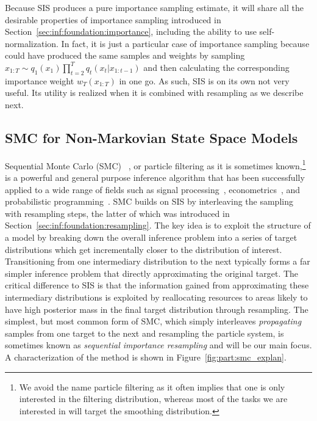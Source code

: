 Because SIS produces a pure importance sampling estimate, it will share all the desirable properties
of importance sampling introduced in Section~\ref{sec:inf:foundation:importance}, including the
ability to use self-normalization.  In fact, it is just
a particular case of importance sampling because could have produced the same samples and weights
by sampling $x_{1:T} \sim q_1(x_1) \prod_{t=2}^{T} q_t (x_t | x_{1:t-1})$ and then calculating the
corresponding importance weight $w_T(x_{1:T})$ in one go. As such, 
SIS is on its own not very useful.  Its utility is realized when it is combined with resampling as we describe next.

\subsection{SMC for Non-Markovian State Space Models}
\label{sec:part:smc:smc-nmssm}

Sequential Monte Carlo (SMC)~\citep{gordon1993novel,doucet2001sequential,doucet2009tutorial} , or particle filtering 
as it is sometimes known,\footnote{We avoid the name
	particle filtering as it often implies that one is only interested in the filtering distribution, whereas
	most of the tasks we are interested in will target the smoothing distribution.} 
is a powerful and general purpose inference algorithm that has been successfully
applied to a wide range of fields such as signal processing~\citep{candy2016bayesian}, econometrics~\citep{creal2012survey}, 
and probabilistic programming~\citep{wood2014new}.  SMC builds on SIS by interleaving the sampling
with resampling steps, the latter
of which was introduced in Section~\ref{sec:inf:foundation:resampling}.
The key idea is to exploit the structure of a model by breaking down the overall 
inference problem into a series of target distributions which get incrementally closer to the 
distribution of interest.  Transitioning from one intermediary distribution to the next typically
forms a far simpler inference problem that directly approximating the original target.  The critical difference
to SIS is that
the information gained from approximating these intermediary distributions is exploited by
reallocating resources to areas likely to have high posterior mass in the final target distribution
through resampling.  The simplest, but most common form of SMC, which simply interleaves
\emph{propagating} samples from one target to the next and resampling the particle system, is sometimes known
as \emph{sequential importance resampling} and will be our main focus.
A characterization of the method is shown in Figure~\ref{fig:part:smc_explan}.  

